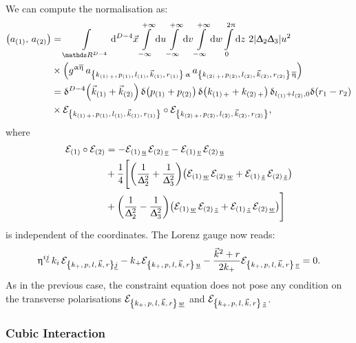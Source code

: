 We can compute the normalisation as:
\begin{equation}
  \begin{split}
    \qty( a_{(1)},\, a_{(2)} )
    & =
    \int\limits_{\R^{D-4}} \dd[D-4]{\vec{x}}
    \infinfint{u}
    \infinfint{v}
    \infinfint{w}
    \finiteint{z}{0}{2\pi}\,
    2 \abs{\Delta_2 \Delta_3} u^2
    \\
    & \times
    \qty(g^{\alpha\beta}\, a_{\kmkrgenN{1}\, \alpha}\, a_{\kmkrgenN{2}\, \beta})
    \\
    & =
    \delta^{D-4}\qty( \vec{k}_{\qty(1)} + \vec{k}_{\qty(2)} )\,
    \delta\qty( p_{(1)} + p_{(2)} )\,
    \delta\qty( k_{\qty(1)\, +} + k_{\qty(2)\, +} )\,
    \delta_{l_{(1)} + l_{(2)}, 0}
    \delta\qty( r_1 - r_2 )
    \\
    & \times
    \cE_{\kmkrgenN{1}} \circ \cE_{\kmkrgenN{2}},
  \end{split}
\end{equation}
where
\begin{equation}
  \begin{split}
    \cE_{(1)} \circ \cE_{(2)}
    & =
    -\cE_{(1)\, \underu}\, \cE_{(2)\, \underv}
    -\cE_{(1)\, \underv}\, \cE_{(2)\, \underu}
    \\
    &
    +\frac{1}{4}
    \Biggl[
        \qty( \frac{1}{\Delta_2^2} + \frac{1}{\Delta_3^2} )
        \qty(%
          \cE_{(1)\, \underw}\, \cE_{(2)\, \underw}
          +
          \cE_{(1)\, \underz}\, \cE_{(2)\, \underz}
        )
    \\
        & +
        \qty( \frac{1}{\Delta_2^2} - \frac{1}{\Delta_3^2} )
        \qty(%
          \cE_{(1)\, \underw}\, \cE_{(2)\, \underz}
          +
          \cE_{(1)\, \underz}\, \cE_{(2)\, \underw}
        )
    \Biggr]
  \end{split}    
\end{equation}
is independent of the coordinates.
The Lorenz gauge now reads:
\begin{equation}
  \upeta^{i\underline{j}}\, k_i \, \mathcal{E}_{{\qty{k_+,\, p,\, l,\, \vec{k},\, r}} \underline{j}}
  -
  k_+
  \mathcal{E}_{\qty{k_+,\, p,\, l,\, \vec{k},\, r}\, \underline{u}}
  -
  \frac{\vec{k}^2 + r}{2 k_+}
  \mathcal{E}_{\qty{k_+,\, p,\, l,\, \vec{k},\, r}\, \underline{v}}
  = 0.
\end{equation}
As in the previous case, the constraint equation does not pose any condition on the transverse polarisations $\mathcal{E}_{\qty{k_+,\, p,\, l,\, \vec{k},\, r}\, \underline{w}}$ and $\mathcal{E}_{\qty{k_+,\, p,\, l,\, \vec{k},\, r}\, \underline{z}}$.


\subsubsection{Cubic Interaction}

